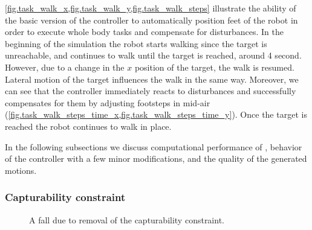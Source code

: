 \cref{fig.task_walk_x,fig.task_walk_y,fig.task_walk_steps} illustrate the
ability of the basic version of the controller to automatically position feet
of the robot in order to execute whole body tasks and compensate for
disturbances. In the beginning of the simulation the robot starts walking since
the target is unreachable, and continues to walk until the target is reached,
around 4 second. However, due to a change in the $x$ position of the target,
the walk is resumed. Lateral motion of the target influences the walk in the
same way. Moreover, we can see that the controller immediately reacts to
disturbances and successfully compensates for them by adjusting footsteps in
mid-air (\cref{fig.task_walk_steps_time_x,fig.task_walk_steps_time_y}).
Once the target is reached the robot continues to walk in place.


In the following subsections we discuss computational performance of
, behavior of the controller with a few minor modifications, and the
quality of the generated motions.




\subsubsection{Capturability constraint}\label{sec.walk_capturability}
\vspace{-0.7cm}
%
\begin{figure}[!htb]
    \begin{minipage}[t]{0.49\textwidth}
    \end{minipage}
    \hfill
    \begin{minipage}[t]{0.49\textwidth}
    \end{minipage}
    \begin{minipage}[t]{0.49\textwidth}
    \end{minipage}
    \hfill
    \begin{minipage}[t]{0.49\textwidth}
    \end{minipage}
    \caption[A fall due to removal of the capturability constraint.]{
        A fall due to removal of the capturability constraint.
    }
    \label{fig.task_walk_fall}
\end{figure}



